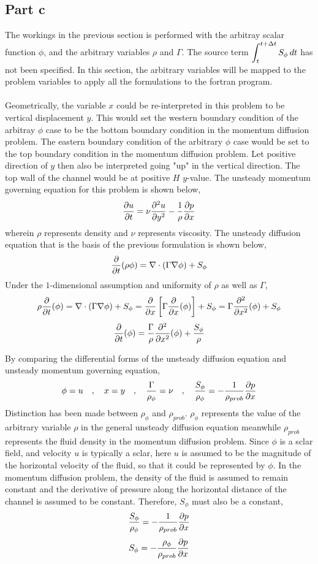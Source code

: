 \documentclass[class=report, 12pt, crop=false]{standalone}
\begin{document}
\begin{center}
\subsection{Part c}
The workings in the previous section is performed with the arbitray scalar function $\phi$, and the arbitrary variables $\rho$ and $\Gamma$. The source term $\displaystyle{\int^{t+\Delta t}_{t} S_\phi\,dt}$ has not been specified. In this section, the arbitrary variables will be mapped to the problem variables to apply all the formulations to the fortran program.
\\~\\Geometrically, the variable $x$ could be re-interpreted in this problem to be vertical displacement $y$. This would set the western boundary condition of the arbitray $\phi$ case to be the bottom boundary condition in the momentum diffusion problem. The eastern boundary condition of the arbitrary $\phi$ case would be set to the top boundary condition in the momentum diffusion problem. Let positive direction of $y$ then also be interpreted going "up" in the vertical direction. The top wall of the channel would be at positive $H$ $y$-value. The unsteady momentum governing equation for this problem is shown below,
$$\frac{\partial u}{\partial t} = \nu\frac{\partial^2 u}{\partial y^2} -\frac{1}{\rho}\frac{\partial p}{\partial x}$$
wherein $\rho$ represents density and $\nu$ represents viscosity. The unsteady diffusion equation that is the basis of the previous formulation is shown below,
$$\frac{\partial}{\partial t}(\rho \phi) = \nabla\cdot(\Gamma \nabla\phi) + S_\phi$$
Under the $1$-dimensional assumption and uniformity of $\rho$ as well as $\Gamma$,
$$\rho\frac{\partial}{\partial t}(\phi) = \nabla\cdot(\Gamma \nabla\phi) + S_\phi = \frac{\partial}{\partial x}\left[\Gamma \frac{\partial}{\partial x}(\phi)\right] + S_\phi = \Gamma \frac{\partial^2}{\partial x^2}(\phi) + S_\phi$$
$$\frac{\partial}{\partial t}(\phi) = \frac{\Gamma}{\rho} \frac{\partial^2}{\partial x^2}(\phi) + \frac{S_\phi}{\rho}$$

By comparing the differential forms of the unsteady diffusion equation and unsteady momentum governing equation,
$$\phi = u \quad,\quad x = y \quad,\quad \frac{\Gamma}{\rho_\phi} = \nu \quad,\quad \frac{S_\phi}{\rho_\phi} = -\frac{1}{\rho_{prob}}\frac{\partial p}{\partial x}$$
Distinction has been made between $\rho_{\phi}$ and $\rho_{prob}$. $\rho_\phi$ represents the value of the arbitrary variable $\rho$ in the general unsteady diffusion equation meanwhile $\rho_{prob}$ represents the fluid density in the momentum diffusion problem. Since $\phi$ is a sclar field, and velocity $u$ is typically a sclar, here $u$ is assumed to be the magnitude of the horizontal velocity of the fluid, so that it could be represented by $\phi$. In the momentum diffusion problem, the density of the fluid is assumed to remain constant and the derivative of pressure along the horizontal distance of the channel is assumed to be constant. Therefore, $S_\phi$ must also be a constant,
$$\frac{S_\phi}{\rho_\phi} = -\frac{1}{\rho_{prob}}\frac{\partial p}{\partial x}$$
$$S_\phi = -\frac{\rho_\phi}{\rho_{prob}}\frac{\partial p}{\partial x}$$


\end{center}
\end{document}
